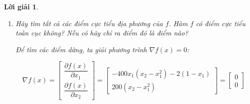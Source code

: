 \documentclass[14pt, a4paper]{article}
\theoremstyle{sltheorem}
\theoremstyle{soltheorem}
\newtheorem*{loigiai}{Lời giải}
\begin{document}
\begin{loigiai}
\begin{enumerate} [wide, labelwidth=!, labelindent=0pt,label=\textbf{\arabic*}.]
            Dấu của định thức này phụ thuộc vào $x_1, x_2$.
            \begin{itemize}
                \item Nếu $x_2 > \dfrac{1200x_1^2 + 2}{400}$ thì định thức $\det (\begin{bmatrix} -400 x_2 + 1200x_1^2 + 2 \end{bmatrix})<0$. Theo định lý \ref{dl:Extended-Sylvester}, ma trận $\nabla^2 f(x)$ không đạt điều kiện cần để là một ma trận nửa xác định dương. Vì vậy $\nabla^2 f(x)$ không là một ma trận nửa xác định dương.
                \item Nếu $x_2 < \dfrac{1200x_1^2 + 2}{400}$ thì $\det (\begin{bmatrix} -400 x_2 + 1200x_1^2 + 2 \end{bmatrix})>0$. Theo định lý \ref{dl:Extended-Sylvester}, ma trận $\nabla^2 f(x)$ không đạt điều kiện cần để là một ma trận nửa xác định âm. Vì vậy $\nabla^2 f(x)$ không là một ma trận nửa xác định âm.
            \end{itemize}
            Ma trận Hessian $\nabla^2 f(x)$ vừa là một ma trận không nửa xác định dương và là một ma trận không nửa xác định âm nên $\nabla^2 f(x)$ là ma trận không xác định dấu.

            $\nabla^2 f(x)$ là ma trận không xác định dấu nên $f(x)$ không là hàm lồi.

            \item Hãy tìm tất cả các điểm cực tiểu địa phương của $f$. Hàm $f$ có điểm cực tiểu toàn cục không? Nếu có hãy chỉ ra điểm đó là điểm nào?
            
            Để tìm các điểm dừng, ta giải phương trình $\nabla f(x)=0$:

            \begin{equation*}
                \nabla f(x) = \begin{bmatrix} \dfrac{\partial f(x)}{\partial x_1} \\ \dfrac{\partial f(x)}{\partial x_2}\end{bmatrix} = \begin{bmatrix} -400x_1(x_2 - x_1^2) -2(1-x_1) \\ 200(x_2 - x_1^2) \end{bmatrix} = \begin{bmatrix} 0 \\ 0 \end{bmatrix}
            \end{equation*}


\end{enumerate}
\end{loigiai}
\end{document}
